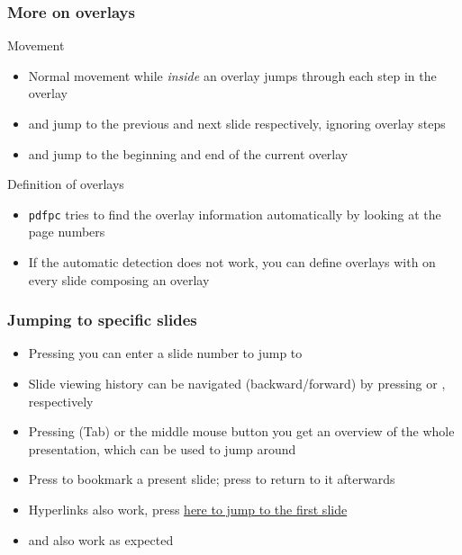 \documentclass{beamer}
\newcommand{\pdfpc}{\texttt{pdfpc}\xspace}
\begin{document}
\begin{frame}
  \frametitle{More on overlays}
  \begin{block}{Movement}
    \begin{itemize}
      \item Normal movement while \emph{inside} an overlay jumps through each
        step in the overlay
      \item {} and 
        jump to the previous and next slide respectively, ignoring overlay steps
      \item \keys{\shift+\arrowkeyup} and \keys{\shift+\arrowkeydown} jump to
        the beginning and end of the current overlay
    \end{itemize}
  \end{block}
  \begin{block}{Definition of overlays}
    \begin{itemize}
      \item \pdfpc tries to find the overlay information automatically by
        looking at the page numbers
      \item If the automatic detection does not work, you can define overlays
        with  on every slide composing an overlay
    \end{itemize}
  \end{block}
\end{frame}

\begin{frame}
  \frametitle{Jumping to specific slides}
  \begin{itemize}
    \item Pressing  you can enter a slide number to jump to
    \item Slide viewing history can be navigated (backward/forward) by pressing
      \keys{\shift+\backspace} or \keys{\shift+\SPACE}, respectively
    \item Pressing \keys{\tab} (Tab) or the middle mouse button you get an
      overview of the whole presentation, which can be used to jump around
    \item Press  to bookmark a present slide; press  to
      return to it afterwards
    \item Hyperlinks also work, press \hyperlink{titlePage}{here to jump to the
      first slide}
    \item {} and  also work as expected
  \end{itemize}
\end{frame}
\end{document}
